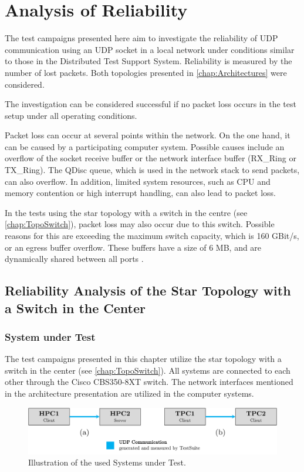 \chapter{Analysis of Reliability}

The test campaigns presented here aim to investigate the reliability of UDP communication using an UDP socket in a local network under conditions similar to those in the Distributed Test Support System. Reliability is measured by the number of lost packets. Both topologies presented in \ref{chap:Architectures} were considered.

The investigation can be considered successful if no packet loss occurs in the test setup under all operating conditions.

Packet loss can occur at several points within the network. On the one hand, it can be caused by a participating computer system. Possible causes include an overflow of the socket receive buffer or the network interface buffer (RX\_Ring or TX\_Ring). The QDisc queue, which is used in the network stack to send packets, can also overflow. In addition, limited system resources, such as CPU and memory contention or high interrupt handling, can also lead to packet loss.

In the tests using the star topology with a switch in the centre (see \ref{chap:TopoSwitch}), packet loss may also occur due to this switch. Possible reasons for this are exceeding the maximum switch capacity, which is 160 GBit/s, or an egress buffer overflow. These buffers have a size of 6 MB, and are dynamically shared between all ports \cite{setup09}.

\clearpage
\section{Reliability Analysis of the Star Topology with a Switch in the Center} \label{chap:switchtest}

\subsection{System under Test}
The test campaigns presented in this chapter utilize the star topology with a switch in the center (see \ref{chap:TopoSwitch}). All systems are connected to each other through the Cisco CBS350-8XT switch. The network interfaces mentioned in the architecture presentation are utilized in the computer systems.

\begin{figure}[h!]
    \centering
    \includegraphics[width=1\linewidth]{figures/reliability/star/rel_g_1.pdf}
    \caption{Illustration of the used Systems under Test.}
    \label{fig:sutreliability}
\end{figure}

